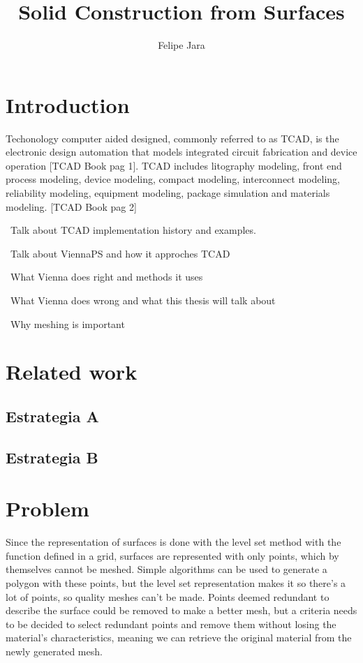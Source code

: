 \documentclass[submission]{eptcs}
\title{Solid Construction from Surfaces}
\author{ Felipe Jara
\institute{Department of Computer Science\\
University of Chile\\
Santiago, Chile}
\email{fjararibet@gmail.com}
}
\begin{document}
\maketitle

\section{Introduction}

Techonology computer aided designed, commonly referred to as TCAD, is the electronic design automation that models integrated circuit fabrication and device operation [TCAD Book pag 1]. TCAD includes litography modeling, front end process modeling, device modeling, compact modeling, interconnect modeling, reliability modeling, equipment modeling, package simulation and materials modeling. [TCAD Book pag 2]

~Talk about TCAD implementation history and examples.

~Talk about ViennaPS and how it approches TCAD

~What Vienna does right and methods it uses

~What Vienna does wrong and what this thesis will talk about

~Why meshing is important


\section{Related work}



\subsection{ Estrategia  A}




\subsection{ Estrategia B}


\section{Problem}

Since the representation of surfaces is done with the level set method with the \theta function defined in a grid, surfaces are represented with only points, which by themselves cannot be meshed. Simple algorithms can be used to generate a polygon with these points, but the level set representation makes it so there's a lot of points, so quality meshes can't be made. Points deemed redundant to describe the surface could be removed to make a better mesh, but a criteria needs to be decided to select redundant points and remove them without losing the material's characteristics, meaning we can retrieve the original material from the newly generated mesh.
\end{document}

